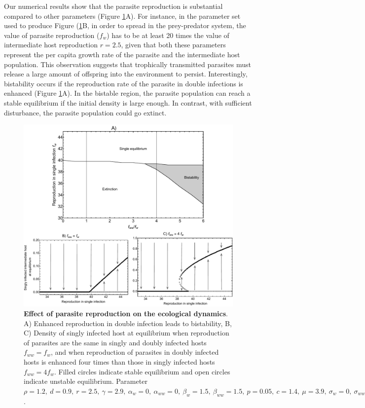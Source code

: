 \documentclass[a4paper]{scrartcl}
\begin{document}
Our numerical results show that the parasite reproduction is substantial compared to other parameters (Figure \ref{fig:bistability}A). 
For instance, in the parameter set used to produce Figure (\ref{fig:bistability}B, in order to spread in the prey-predator system, the value of parasite reproduction ($f_w$) has to be at least  20 times the value of intermediate host reproduction $r = 2.5$, given that both these parameters represent the per capita growth rate of the parasite and the intermediate host population.
This observation suggests that trophically transmitted parasites must release a large amount of offspring into the environment to persist. 
Interestingly, bistability occurs if the reproduction rate of the parasite in double infections is enhanced (Figure \ref{fig:bistability}A). 
In the bistable region, the parasite population can reach a stable equilibrium if the initial density is large enough. 
In contrast, with sufficient disturbance, the parasite population could go extinct.

\begin{figure}[!ht]
\captionsetup{format=plain}
\includegraphics[width = \textwidth]{Figures/reproduction_bifurcation.pdf}
\caption{\textbf{Effect of parasite reproduction on the ecological dynamics}. A) Enhanced reproduction in double infection leads to bistability, B, C) Density of singly infected host at equilibrium when reproduction of parasites are the same in singly and doubly infected hosts $f_{ww} = f_w$, and when reproduction of parasites in doubly infected hosts is enhanced four times than those in singly infected hosts $f_{ww} = 4 f_w$. Filled circles indicate stable equilibrium and open circles indicate unstable equilibrium. Parameter $\rho = 1.2, \  d = 0.9, \  r = 2.5, \ \gamma = 2.9, \ \alpha_w = 0, \ \alpha_{ww} =  0, \ \beta_w = 1.5, \ \beta_{ww} = 1.5, \ p = 0.05, \  c = 1.4, \ \mu = 3.9,  \ \sigma_w = 0, \ \sigma_{ww} = 0, \  q = 0.05, \ \delta = 0.9, \ k = 0.26, \ h = 0.6$.
}
\label{fig:bistability}
\end{figure}
\end{document}
